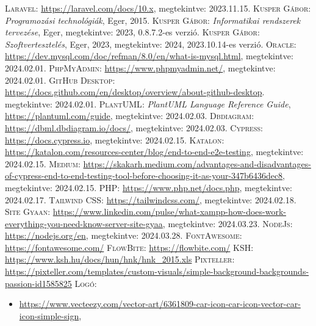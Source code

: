 \documentclass[]{thesis-ekf}
\theoremstyle{definition}
\theoremstyle{remark}
\begin{document}
	
	\begin{thebibliography}{2}
		\textsc{Laravel:} \url{https://laravel.com/docs/10.x},  megtekintve: 2023.11.15.
		\textsc{Kusper Gábor}: \emph{Programozási technológiák}, Eger, 2015.
		\textsc{Kusper Gábor}: \emph{Informatikai rendszerek tervezése}, Eger, megtekintve: 2023, 0.8.7.2-es verzió.
		\textsc{Kusper Gábor}: \emph{Szoftvertesztelés}, Eger, 2023, megtekintve: 2024, 2023.10.14-es verzió.
		\textsc{Oracle}: \url{https://dev.mysql.com/doc/refman/8.0/en/what-is-mysql.html}, megtekintve: 2024.02.01.
		\textsc{PhpMyAdmin}: \url{https://www.phpmyadmin.net/}, megtekintve: 2024.02.01.
		\textsc{GitHub Desktop}: \url{https://docs.github.com/en/desktop/overview/about-github-desktop}. megtekintve: 2024.02.01.
		\textsc{PlantUML}: \emph{PlantUML Language Reference Guide}, \url{https://plantuml.com/guide}, megtekintve: 2024.02.03.
		\textsc{Dbdiagram}: \url{https://dbml.dbdiagram.io/docs/},  megtekintve: 2024.02.03.
		\textsc{Cypress}: \url{https://docs.cypress.io},  megtekintve: 2024.02.15.
		\textsc{Katalon}: \url{https://katalon.com/resources-center/blog/end-to-end-e2e-testing},  megtekintve: 2024.02.15.
		\textsc{Medium}: \url{https://skakarh.medium.com/advantages-and-disadvantages-of-cypress-end-to-end-testing-tool-before-choosing-it-as-your-347b6436dec8}, megtekintve: 2024.02.15.
		\textsc{PHP}: \url{https://www.php.net/docs.php},  megtekintve: 2024.02.17.
		\textsc{Tailwind CSS}: \url{https://tailwindcss.com/}, megtekintve: 2024.02.18.
		\textsc{Site Gyaan}: \url{https://www.linkedin.com/pulse/what-xampp-how-does-work-everything-you-need-know-server-site-gyaa}, megtekintve: 2024.03.23.
		\textsc{NodeJs}: \url{https://nodejs.org/en}, megtekintve: 2024.03.28.
		\textsc{FontAwesome}: \url{https://fontawesome.com/}
		\textsc{FlowBite}: \url{https://flowbite.com/}
		\textsc{KSH}: \url{https://www.ksh.hu/docs/hun/hnk/hnk_2015.xls}
		\textsc{Pixteller}: \url{https://pixteller.com/templates/custom-visuals/simple-background-backgrounds-passion-id1585825}
		\textsc{Logó}:
			\begin{itemize}
				\item \url{https://www.vecteezy.com/vector-art/6361809-car-icon-car-icon-vector-car-icon-simple-sign},

\end{itemize}
\end{thebibliography}
\end{document}
